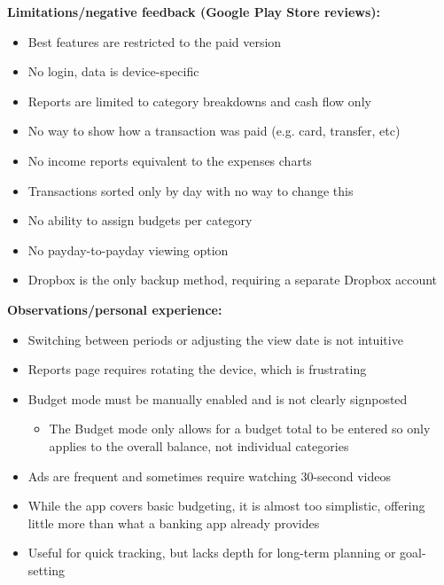 \documentclass{l4proj}
\begin{document}
\begin{appendices}
\textbf{Limitations/negative feedback (Google Play Store reviews):}
\begin{itemize}
    \item Best features are restricted to the paid version
    \item No login, data is device-specific
    \item Reports are limited to category breakdowns and cash flow only
    \item No way to show how a transaction was paid (e.g. card, transfer, etc)
    \item No income reports equivalent to the expenses charts
    \item Transactions sorted only by day with no way to change this
    \item No ability to assign budgets per category
    \item No payday-to-payday viewing option
    \item Dropbox is the only backup method, requiring a separate Dropbox account
\end{itemize}
\vspace{0.5em}

\textbf{Observations/personal experience:}
\begin{itemize}
    \item Switching between periods or adjusting the view date is not intuitive
    \item Reports page requires rotating the device, which is frustrating
    \item Budget mode must be manually enabled and is not clearly signposted
    \begin{itemize}
        \item The Budget mode only allows for a budget total to be entered so only applies to the overall balance, not individual categories
    \end{itemize}
    \item Ads are frequent and sometimes require watching 30-second videos
    \item While the app covers basic budgeting, it is almost too simplistic, offering little more than what a banking app already provides
    \item Useful for quick tracking, but lacks depth for long-term planning or goal-setting
\end{itemize}


\end{appendices}
\end{document}
